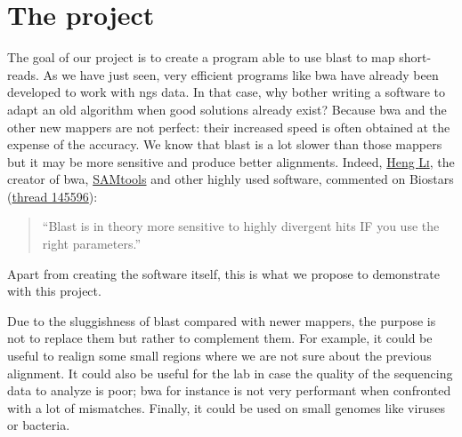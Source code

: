 \section{The project}
The goal of our project is to create a program able to use \gls{blast} to map short-reads.
As we have just seen, very efficient programs like \gls{bwa} have already been developed to work with \gls{ngs} data.
In that case, why bother writing a software to adapt an old algorithm when good solutions already exist?
Because \gls{bwa} and the other new mappers are not perfect: their increased speed is often obtained at the expense of the accuracy.
We know that \gls{blast} is a lot slower than those mappers but it may be more sensitive and produce better alignments.
Indeed, \href{http://lh3lh3.users.sourceforge.net/}{Heng \textsc{Li}}, the creator of \gls{bwa}, \href{http://www.htslib.org/}{SAMtools} and other highly used software, commented on Biostars (\href{https://www.biostars.org/p/145596/}{thread 145596}):
\begin{quote}
``Blast is in theory more sensitive to highly divergent hits IF you use the right parameters.''
\end{quote}
Apart from creating the software itself, this is what we propose to demonstrate with this project.

Due to the sluggishness of \gls{blast} compared with newer mappers, the purpose is not to replace them but rather to complement them.
For example, it could be useful to realign some small regions where we are not sure about the previous alignment.
It could also be useful for the lab in case the quality of the sequencing data to analyze is poor; \gls{bwa} for instance is not very performant when confronted with a lot of mismatches.
Finally, it could be used on small genomes like viruses or bacteria.

